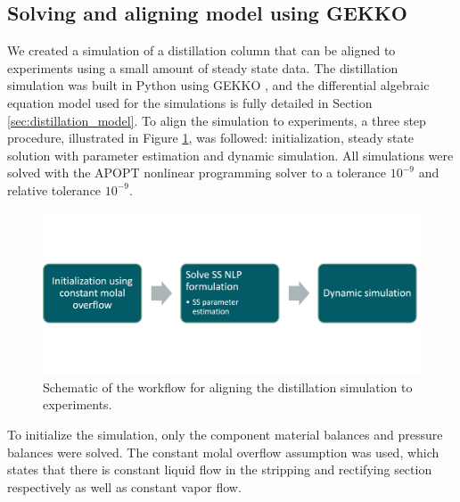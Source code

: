 \subsection{Solving and aligning model using GEKKO}

We created a simulation of a distillation column that can be aligned to experiments using a small amount of steady state data. The distillation simulation was built in Python using GEKKO \cite{Beal2018}, and the differential algebraic equation model used for the simulations is fully detailed in Section \ref{sec:distillation_model}. To align the simulation to experiments, a three step procedure, illustrated in Figure \ref{fig:simulation_workflow}, was followed: initialization, steady state solution with parameter estimation and dynamic simulation. All simulations were solved with the APOPT nonlinear programming solver to a tolerance $10^{-9}$ and relative tolerance $10^{-9}$.

\begin{figure}
    \centering
    \includegraphics[width=\textwidth]{gfx/Chapter06/simulation_workflow.png}
    \caption{Schematic of the workflow for aligning the distillation simulation to experiments.}
    \label{fig:simulation_workflow}
\end{figure}

To initialize  the simulation, only the component material balances and pressure balances were solved. The constant molal overflow assumption was used, which states that there is constant liquid flow in the stripping and rectifying section respectively as well as constant vapor flow. 

